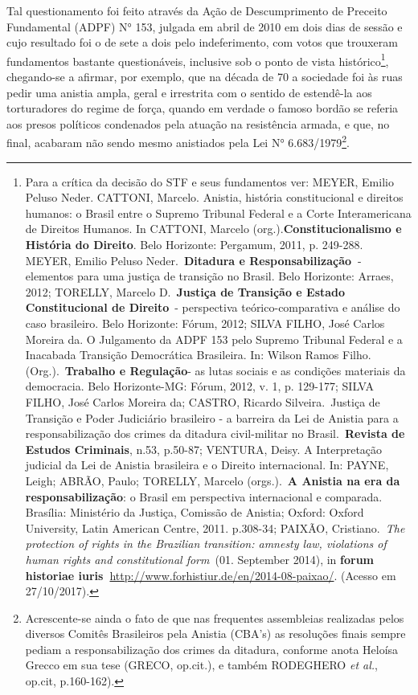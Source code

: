 Tal questionamento foi feito através da Ação de Descumprimento de
Preceito Fundamental (ADPF) N° 153, julgada em abril de 2010 em dois
dias de sessão e cujo resultado foi o de sete a dois pelo indeferimento,
com votos que trouxeram fundamentos bastante questionáveis, inclusive
sob o ponto de vista histórico\footnote{Para a crítica da decisão do STF
  e seus fundamentos ver: MEYER, Emilio Peluso Neder. CATTONI, Marcelo.
  Anistia, história constitucional e direitos humanos: o Brasil entre o
  Supremo Tribunal Federal e a Corte Interamericana de Direitos Humanos.
  In CATTONI, Marcelo (org.).\textbf{Constitucionalismo e História do
  Direito}. Belo Horizonte: Pergamum, 2011, p. 249-288. MEYER, Emilio
  Peluso Neder.~\textbf{Ditadura e Responsabilização~}- elementos para
  uma justiça de transição no Brasil. Belo Horizonte: Arraes, 2012;
  TORELLY, Marcelo D.~\textbf{Justiça de Transição e Estado
  Constitucional de Direito}~- perspectiva teórico-comparativa e análise
  do caso brasileiro. Belo Horizonte: Fórum, 2012; SILVA FILHO, José
  Carlos Moreira da. O Julgamento da ADPF 153 pelo Supremo Tribunal
  Federal e a Inacabada Transição Democrática Brasileira. In: Wilson
  Ramos Filho. (Org.).~\textbf{Trabalho e Regulação}- as lutas sociais e
  as condições materiais da democracia. Belo Horizonte-MG: Fórum, 2012,
  v. 1, p. 129-177; SILVA FILHO, José Carlos Moreira da; CASTRO, Ricardo
  Silveira.~Justiça de Transição e Poder Judiciário brasileiro - a
  barreira da Lei de Anistia para a responsabilização dos crimes da
  ditadura civil-militar no Brasil.~\textbf{Revista de Estudos
  Criminais}, n.53, p.50-87; VENTURA, Deisy. A Interpretação judicial da
  Lei de Anistia brasileira e o Direito internacional. In: PAYNE, Leigh;
  ABRÃO, Paulo; TORELLY, Marcelo (orgs.).~\textbf{A Anistia na era da
  responsabilização}: o Brasil em perspectiva internacional e comparada.
  Brasília: Ministério da Justiça, Comissão de Anistia; Oxford: Oxford
  University, Latin American Centre, 2011. p.308-34; PAIXÃO,
  Cristiano.~\emph{The protection of rights in the Brazilian transition:
  amnesty law, violations of human rights and constitutional form}~(01.
  September 2014), in \textbf{forum historiae
  iuris~}\href{http://www.forhistiur.de/en/2014-08-paixao/}{{http://www.forhistiur.de/en/2014-08-paixao/}}.
  (Acesso em 27/10/2017).}, chegando-se a afirmar, por exemplo, que na
década de 70 a sociedade foi às ruas pedir uma anistia ampla, geral e
irrestrita com o sentido de estendê-la aos torturadores do regime de
força, quando em verdade o famoso bordão se referia aos presos políticos
condenados pela atuação na resistência armada, e que, no final, acabaram
não sendo mesmo anistiados pela Lei N° 6.683/1979\footnote{Acrescente-se
  ainda o fato de que nas frequentes assembleias realizadas pelos
  diversos Comitês Brasileiros pela Anistia (CBA's) as resoluções finais
  sempre pediam a responsabilização dos crimes da ditadura, conforme
  anota Heloísa Grecco em sua tese (GRECO, op.cit.), e também RODEGHERO
  \emph{et al.}, op.cit, p.160-162).}.

